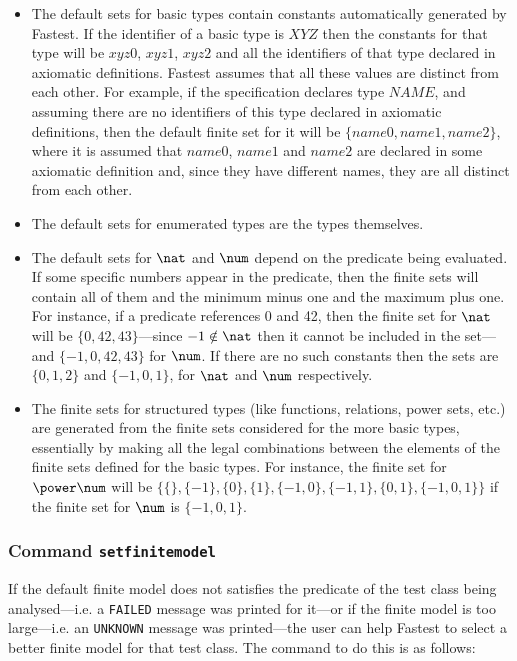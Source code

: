\begin{itemize}
\item The default sets for basic types contain constants automatically generated by Fastest. If the identifier of a basic type is $XYZ$ then the constants for that type will be $xyz0$, $xyz1$, $xyz2$ and all the identifiers of that type declared in axiomatic definitions. Fastest assumes that all these values are distinct from each other. For example, if the specification declares type $NAME$, and assuming there are no identifiers of this type declared in axiomatic definitions, then the default finite set for it will be $\{name0, name1, name2\}$, where it is assumed that $name0$, $name1$ and $name2$ are declared in some axiomatic definition and, since they have different names, they are all distinct from each other. 

\item The default sets for enumerated types are the types themselves.

\item The default sets for $\nat$ and $\num$ depend on the predicate being evaluated. If some specific numbers appear in the predicate, then the finite sets will contain all of them and the minimum minus one and the maximum plus one. For instance, if a predicate references 0 and 42, then the finite set for $\nat$ will be $\{0, 42, 43\}$---since $-1 \notin \nat$ then it cannot be included in the set---and $\{-1,0,42,43\}$ for $\num$. If there are no such constants then the sets are $\{0,1,2\}$ and $\{-1,0,1\}$, for $\nat$ and $\num$ respectively.

\item The finite sets for structured types (like functions, relations, power sets, etc.) are generated from the finite sets considered for the more basic types, essentially by making all the legal combinations between the elements of the finite sets defined for the basic types. For instance, the finite set for $\power \num$ will be $\{\{\},\{-1\},\{0\},\{1\},\{-1,0\},\{-1,1\},\{0,1\},\{-1,0,1\}\}$ if the finite set for $\num$ is $\{-1,0,1\}$.
\end{itemize}

\subsubsection{Command {\tt setfinitemodel}}
If the default finite model does not satisfies the predicate of the test class being analysed---i.e. a \verb+FAILED+ message was printed for it---or if the finite model is too large---i.e. an \verb+UNKNOWN+ message was printed---the user can help Fastest to select a better finite model for that test class. The command to do this is as follows:


